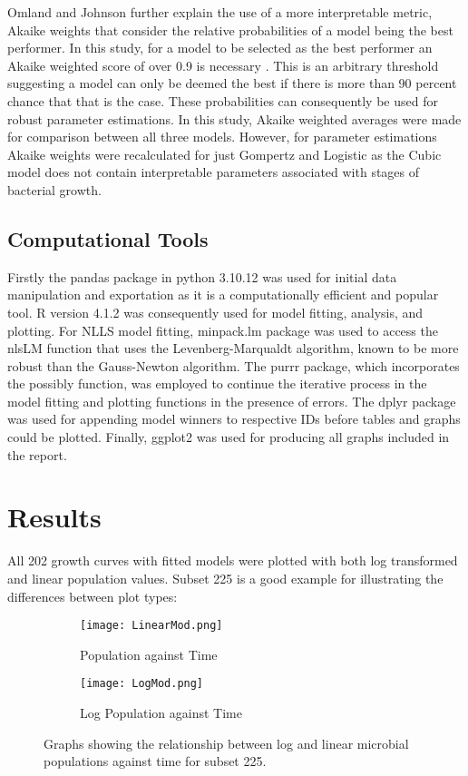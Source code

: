 \documentclass[11pt]{article}
\begin{document}
Omland and Johnson further explain the use of a more interpretable metric, Akaike weights that consider the relative probabilities of a model being the best performer. In this study, for a model to be selected as the best performer an Akaike weighted score of over 0.9 is necessary \cite{DASH2023103140}. This is an arbitrary threshold suggesting a model can only be deemed the best if there is more than 90 percent chance that that is the case. These probabilities can consequently be used for robust parameter estimations. In this study, Akaike weighted averages were made for comparison between all three models. However, for parameter estimations Akaike weights were recalculated for just Gompertz and Logistic as the Cubic model does not contain interpretable parameters associated with stages of bacterial growth.

\subsection{Computational Tools}

Firstly the pandas package in python 3.10.12 \cite{10.5555/1593511} was used for initial data manipulation and exportation as it is a computationally efficient and popular tool. R version 4.1.2 \cite{R} was consequently used for model fitting,  analysis, and plotting. For NLLS model fitting, minpack.lm package was used to access the nlsLM function that uses the Levenberg-Marqualdt algorithm, known to be more robust than the Gauss-Newton algorithm. The purrr package, which incorporates the possibly function, was employed to continue the iterative process in the model fitting and plotting functions in the presence of errors. The dplyr package was used for appending model winners to respective IDs before tables and graphs could be plotted. Finally, ggplot2 was used for producing all graphs included in the report.

\section{Results}
All 202 growth curves with fitted models were plotted with both log transformed and linear population values. Subset 225 is a good example for illustrating the differences between plot types:

\begin{figure}[htbp]
    \centering
    \begin{subfigure}{0.5\textwidth}
      \texttt{[image: LinearMod.png]}
      \caption{Population against Time}
    \end{subfigure}%
    \begin{subfigure}{0.5\textwidth}
      \texttt{[image: LogMod.png]}
      \caption{Log Population against Time}
    \end{subfigure}
    \caption{Graphs showing the relationship between log and linear microbial populations against time for subset 225.}
\end{figure}
\end{document}
